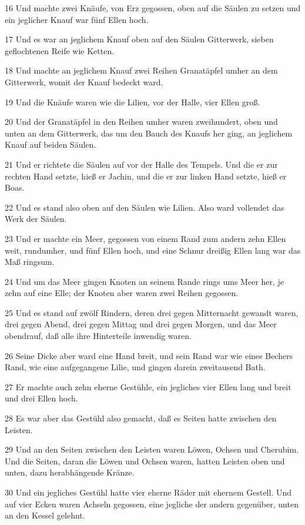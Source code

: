 \par 16 Und machte zwei Knäufe, von Erz gegossen, oben auf die Säulen zu setzen und ein jeglicher Knauf war fünf Ellen hoch.
\par 17 Und es war an jeglichem Knauf oben auf den Säulen Gitterwerk, sieben geflochtenen Reife wie Ketten.
\par 18 Und machte an jeglichem Knauf zwei Reihen Granatäpfel umher an dem Gitterwerk, womit der Knauf bedeckt ward.
\par 19 Und die Knäufe waren wie die Lilien, vor der Halle, vier Ellen groß.
\par 20 Und der Granatäpfel in den Reihen umher waren zweihundert, oben und unten an dem Gitterwerk, das um den Bauch des Knaufs her ging, an jeglichem Knauf auf beiden Säulen.
\par 21 Und er richtete die Säulen auf vor der Halle des Tempels. Und die er zur rechten Hand setzte, hieß er Jachin, und die er zur linken Hand setzte, hieß er Boas.
\par 22 Und es stand also oben auf den Säulen wie Lilien. Also ward vollendet das Werk der Säulen.
\par 23 Und er machte ein Meer, gegossen von einem Rand zum andern zehn Ellen weit, rundumher, und fünf Ellen hoch, und eine Schnur dreißig Ellen lang war das Maß ringsum.
\par 24 Und um das Meer gingen Knoten an seinem Rande rings ums Meer her, je zehn auf eine Elle; der Knoten aber waren zwei Reihen gegossen.
\par 25 Und es stand auf zwölf Rindern, deren drei gegen Mitternacht gewandt waren, drei gegen Abend, drei gegen Mittag und drei gegen Morgen, und das Meer obendrauf, daß alle ihre Hinterteile inwendig waren.
\par 26 Seine Dicke aber ward eine Hand breit, und sein Rand war wie eines Bechers Rand, wie eine aufgegangene Lilie, und gingen darein zweitausend Bath.
\par 27 Er machte auch zehn eherne Gestühle, ein jegliches vier Ellen lang und breit und drei Ellen hoch.
\par 28 Es war aber das Gestühl also gemacht, daß es Seiten hatte zwischen den Leisten.
\par 29 Und an den Seiten zwischen den Leisten waren Löwen, Ochsen und Cherubim. Und die Seiten, daran die Löwen und Ochsen waren, hatten Leisten oben und unten, dazu herabhängende Kränze.
\par 30 Und ein jegliches Gestühl hatte vier eherne Räder mit ehernem Gestell. Und auf vier Ecken waren Achseln gegossen, eine jegliche der andern gegenüber, unten an den Kessel gelehnt.
